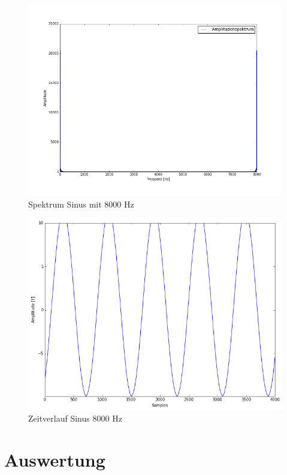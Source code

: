 \documentclass[12pt,oneside,a4paper]{report}
\begin{document}
\begin{figure}[H]
\centering\small
\includegraphics[scale=0.4]{src/8000fft.png}
\caption{Spektrum Sinus mit 8000 Hz}
\label{fig:8000_FFT}
\end{figure}

\begin{figure}[H]
\centering\small
\includegraphics[scale=0.4]{src/Sinus8000Hz.png}
\caption{Zeitverlauf Sinus 8000 Hz}
\label{fig:8000_TIME}
\end{figure}

\section{Auswertung}
\label{chap:VERSUCH_4_AUSWERTUNG}
\end{document}
